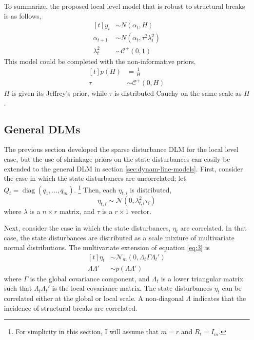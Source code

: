 \documentclass{article}
\newcommand{\dist}[1]{\mathcal{#1}}
\newcommand{\paren}[1]{\ensuremath{\left(#1\right)}}
\newcommand{\dnorm}[1]{\ensuremath{\dist{N}\paren{#1}}}
\newcommand{\dmvnorm}[2]{\ensuremath{\dist{N}_{#2}\paren{#1}}}
\newcommand{\dhalfcauchy}[1]{\ensuremath{\dist{C}^{+}\paren{#1}}}
\DeclareMathOperator{\diag}{diag}
\begin{document}
To summarize, the proposed local level model that is robust to structural breaks is as follows,
\begin{equation}
  \label{eq:10}
  \begin{aligned}[t]
    y_{t} &\sim N(\alpha_{t}, H) \\
    \alpha_{t + 1} &\sim N(\alpha_{t}, \tau^{2} \lambda^{2}_{t}) \\
    \lambda^{2}_{t} & \sim \dhalfcauchy{0, 1}
  \end{aligned}
\end{equation}
This model could be completed with the non-informative priors,
\begin{equation}
  \label{eq:7}
  \begin{aligned}[t]
    p(H) &= \frac{1}{H} \\
    \tau &\sim \dhalfcauchy{0, H}
  \end{aligned}
\end{equation}
$H$ is given its Jeffrey's prior, while $\tau$ is distributed Cauchy
on the same scale as $H$.


\subsection{General DLMs}
\label{sec:multivariate}

The previous section developed the sparse disturbance DLM for the local level case, but the use of shrinkage priors on the state disturbances can easily be extended to the general DLM in section \ref{sec:dynam-line-models}.
First, consider the case in which the state disturbances are uncorrelated; let $Q_{t} = \diag(q_{1}, \dots, q_{m})$.%
\footnote{
  For simplicity in this section, I will assume that $m = r$ and $R_{t} = I_{m}$.
}
Then, each $\eta_{t,i}$ is distributed,
\begin{equation}
  \label{eq:20}
  \eta_{t,i} \sim \dnorm{0, \lambda_{t,i}^{2} \tau_{i}}
\end{equation}
where $\lambda$ is a $n \times r$ matrix, and $\tau$ is a $r \times 1$ vector.

Next, consider the case in which the state disturbances, $\eta_{t}$ are correlated.
In that case, the state disturbances are distributed as a scale mixture of multivariate normal distributions.
The multivariate extension of equation \eqref{eq:3} is
\begin{equation}
  \begin{aligned}[t]
    \eta_{t} &\sim \dmvnorm{0, \Lambda_{t} \Gamma \Lambda_{t}'}{m} \\
    \Lambda \Lambda' & \sim p(\Lambda \Lambda')
  \end{aligned}
\end{equation}
where $\Gamma$ is the global covariance component, and $\Lambda_{t}$ is a lower triangular matrix such that  $\Lambda_{t} \Lambda_{t}'$ is the local covariance matrix.
The state disturbances $\eta_{t}$ can be correlated either at the global or local scale.
A non-diagonal $\Lambda$ indicates that the incidence of structural breaks are correlated.
\end{document}
